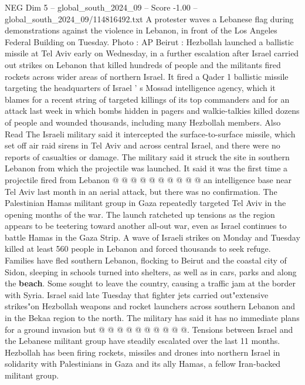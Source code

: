 \begin{textsample}{NEG Dim 5 – global\_south\_2024\_09 – Score -1.00 – global\_south\_2024\_09/114816492.txt}  \label{ex:f5_neg_220}
A protester waves a Lebanese flag during demonstrations against the violence in Lebanon, in front of the Los Angeles Federal Building on Tuesday.
Photo : AP Beirut : Hezbollah launched a ballistic missile at Tel Aviv early on Wednesday, in a further escalation after Israel carried out strikes on Lebanon that killed hundreds of people and the militants fired rockets across wider areas of northern Israel.
It fired a Qader 1 ballistic missile targeting the headquarters of Israel ' s Mossad intelligence agency, which it blames for a recent string of targeted killings of its top commanders and for an attack last week in which bombs hidden in pagers and walkie-talkies killed dozens of people and wounded thousands, including many Hezbollah members.
Also Read The Israeli military said it intercepted the surface-to-surface missile, which set off air raid sirens in Tel Aviv and across central Israel, and there were no reports of casualties or damage.
The military said it struck the site in southern Lebanon from which the projectile was launched.
It said it was the first time a projectile fired from Lebanon @ @ @ @ @ @ @ @ @ @ an intelligence base near Tel Aviv last month in an aerial attack, but there was no confirmation.
The Palestinian Hamas militant group in Gaza repeatedly targeted Tel Aviv in the opening months of the war.
The launch ratcheted up tensions as the region appears to be teetering toward another all-out war, even as Israel continues to battle Hamas in the Gaza Strip.
A wave of Israeli strikes on Monday and Tuesday killed at least 560 people in Lebanon and forced thousands to seek refuge.
Families have fled southern Lebanon, flocking to Beirut and the coastal city of Sidon, sleeping in schools turned into shelters, as well as in cars, parks and along the \textbf{beach}.
Some sought to leave the country, causing a traffic jam at the border with Syria.
Israel said late Tuesday that fighter jets carried out"extensive strikes"on Hezbollah weapons and rocket launchers across southern Lebanon and in the Bekaa region to the north.
The military has said it has no immediate plans for a ground invasion but @ @ @ @ @ @ @ @ @ @.
Tensions between Israel and the Lebanese militant group have steadily escalated over the last 11 months.
Hezbollah has been firing rockets, missiles and drones into northern Israel in solidarity with Palestinians in Gaza and its ally Hamas, a fellow Iran-backed militant group.

\end{textsample}
